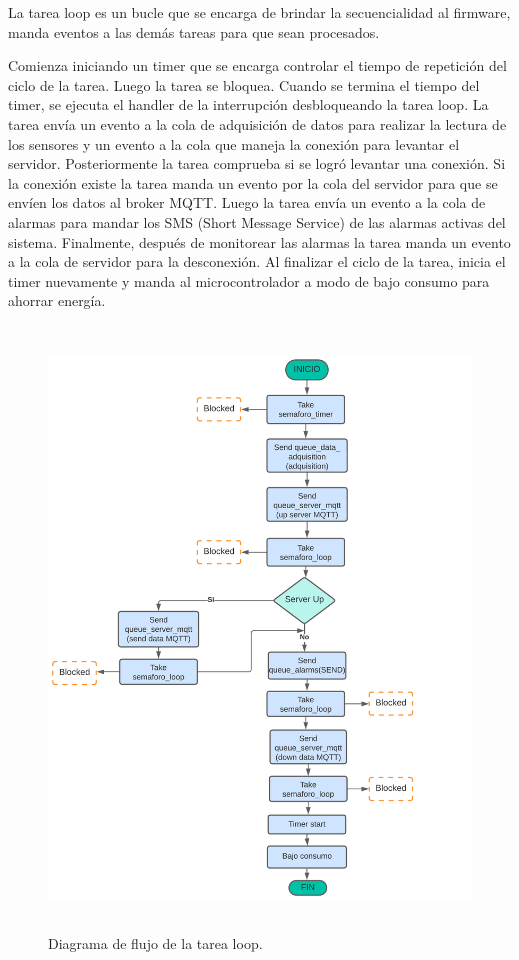 La tarea loop es un bucle que se encarga de brindar la secuencialidad al firmware, manda eventos a las demás tareas para que sean procesados. 

Comienza iniciando un timer que se encarga controlar el tiempo de repetición del ciclo de la tarea. Luego la tarea se bloquea. 
Cuando se termina el tiempo del timer, se ejecuta el handler de la interrupción desbloqueando la tarea loop. La tarea envía un evento a la cola de adquisición de datos para realizar la lectura  de  los sensores y un evento a la cola que maneja la conexión  para levantar el servidor. Posteriormente la tarea comprueba si se logró levantar una conexión. Si la conexión existe la tarea manda un evento  por la cola del servidor para que se envíen los datos al broker MQTT. Luego la tarea  envía un evento a la cola de alarmas para mandar los SMS (Short Message Service) de las alarmas activas del sistema. Finalmente, después de monitorear  las alarmas la tarea manda un evento a la cola de servidor para la desconexión. Al finalizar el ciclo de la tarea, inicia el timer nuevamente y manda al microcontrolador a modo de bajo consumo para ahorrar energía.

\begin{figure}[h]  
\centering
	\includegraphics[width=12cm, height=16cm]{./Figures/DF task loop.png}
	\caption{Diagrama de flujo de la tarea loop.}
	\label{fig:Df tarea loop sistema}
\end{figure}

